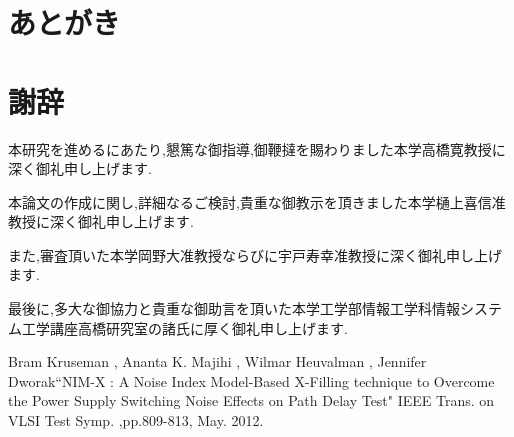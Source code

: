 \chapter{あとがき}



\newpage
{}
\chapter*{謝辞}
本研究を進めるにあたり,懇篤な御指導,御鞭撻を賜わりました本学高橋寛教授に深く御礼申し上げます.

本論文の作成に関し,詳細なるご検討,貴重な御教示を頂きました本学樋上喜信准教授に深く御礼申し上げます.

また,審査頂いた本学岡野大准教授ならびに宇戸寿幸准教授に深く御礼申し上げます.

最後に,多大な御協力と貴重な御助言を頂いた本学工学部情報工学科情報システム工学講座高橋研究室の諸氏に厚く御礼申し上げます.


\begin{thebibliography}{99}

Bram Kruseman , Ananta K. Majihi , Wilmar Heuvalman , Jennifer Dworak“NIM-X : A Noise Index Model-Based X-Filling technique to Overcome the Power Supply Switching Noise Effects on Path Delay Test" IEEE Trans. on VLSI Test Symp. ,pp.809-813, May. 2012.

\end{thebibliography}


